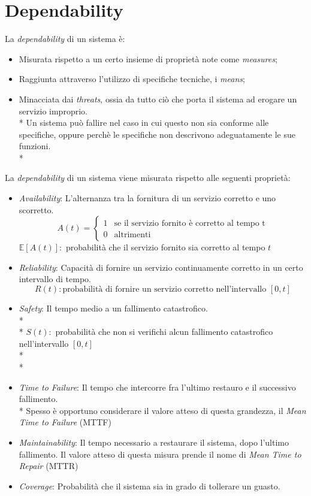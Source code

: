 \section{Dependability}
La \emph{dependability} di un sistema \`e:
\begin{itemize}
	\item Misurata rispetto a un certo insieme di propriet\`a note come \emph{measures};
	\item Raggiunta attraverso l'utilizzo di specifiche tecniche, i \emph{means};
	\item Minacciata dai \emph{threats}, ossia da tutto ci\`o che porta il sistema ad erogare un servizio improprio.\\*
	Un sistema pu\`o fallire nel caso in cui questo non sia conforme alle specifiche, oppure perch\`e le specifiche non descrivono adeguatamente le sue funzioni.\\*
\end{itemize}
La \emph{dependability} di un sistema viene misurata rispetto alle seguenti propriet\`a:
\begin{itemize}
	\item \emph{Availability}: L'alternanza tra la fornitura di un servizio corretto e uno scorretto.
	$$
	A(t) = \begin{cases} 1 & \mbox{se il servizio fornito \`e corretto al tempo t} \\ 0 & \mbox{altrimenti} \end{cases}
	$$
	$\mathbb E[A(t)]:$ probabilit\`a che il servizio fornito sia corretto al tempo $t$
	\item \emph{Reliability}: Capacit\`a di fornire un servizio continuamente corretto in un certo intervallo di tempo.
	$$
	R(t):\mbox{probabilit\`a di fornire un servizio corretto nell'intervallo }[0,t]
	$$
	\item \emph{Safety}: Il tempo medio a un fallimento catastrofico.\\*\\*
	$S(t):$ probabilit\`a che non si verifichi alcun fallimento catastrofico nell'intervallo $[0,t]$\\*\\*
	\item \emph{Time to Failure}: Il tempo che intercorre fra l'ultimo restauro e il successivo fallimento.\\*
	Spesso \`e opportuno considerare il valore atteso di questa grandezza, il \emph{Mean Time to Failure} (MTTF)
	\item \emph{Maintainability}: Il tempo necessario a restaurare il sistema, dopo l'ultimo fallimento. Il valore atteso di questa misura prende il nome di \emph{Mean Time to Repair} (MTTR)
	\item \emph{Coverage}: Probabilit\`a che il sistema sia in grado di tollerare un guasto.
\end{itemize}
